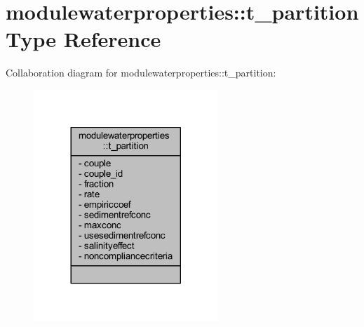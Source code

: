 \hypertarget{structmodulewaterproperties_1_1t__partition}{}\section{modulewaterproperties\+:\+:t\+\_\+partition Type Reference}
\label{structmodulewaterproperties_1_1t__partition}


Collaboration diagram for modulewaterproperties\+:\+:t\+\_\+partition\+:\nopagebreak
\begin{figure}[H]
\begin{center}
\leavevmode
\includegraphics[width=197pt]{structmodulewaterproperties_1_1t__partition__coll__graph}
\end{center}
\end{figure}
